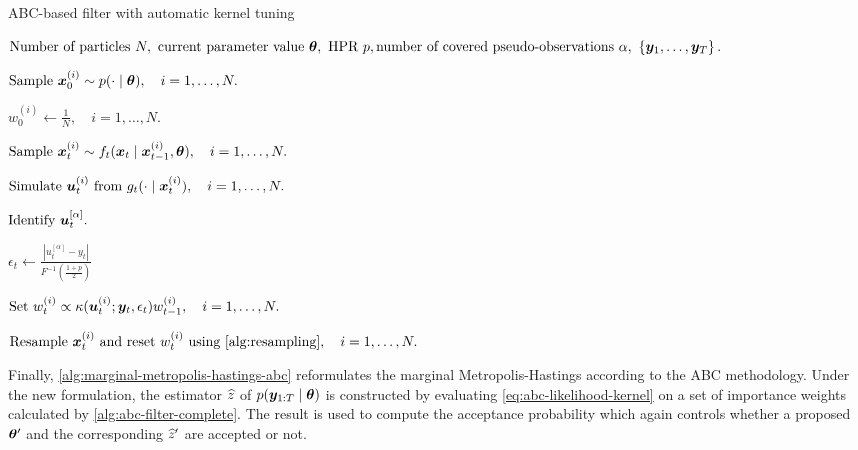 \begin{algorithm}[ht]
    \caption{ABC-based filter with automatic kernel tuning}
    \label{alg:abc-filter-complete}
    \begin{algorithmic}[1]
        \Input $\text{Number of particles } N,\ \text{current parameter value } \btheta, \text{ HPR } p, \newline \text{number of covered pseudo-observations } \alpha,\ \left\{\by_1, \ldots, \by_T\right\}.$
        
        \State $\text{Sample } \bm{x}_0^{(i)} \sim p(\cdot \mid \bm{\theta}), \quad i = 1, \ldots, N.$ 
        
        \State $w_0^{(i)} \gets \frac{1}{N}, \quad i = 1, \ldots, N.$ 
        
        \State $\text{Sample } \bm{x}_t^{(i)} \sim f_t(\bm{x}_t \mid \bm{x}_{t-1}^{(i)}, \bm{\theta}), \quad i = 1, \ldots, N.$ 
        
        \State $\text{Simulate } \bm{u}_t^{(i)} \text{ from } g_t(\cdot \mid \bm{x}_t^{(i)}), \quad i = 1, \ldots, N.$ 
        
        \State $\text{Identify } \bm{u}_t^{[\alpha]}.$ 
        
        \State $\epsilon_t \gets \frac{\left| u_t^{[\alpha]} - y_t \right|}{F^{-1}(\frac{1+p}{2})}$ 
        
        \State $\text{Set } w_t^{(i)} \propto \kappa(\bm{u}_t^{(i)}; \bm{y}_t, \epsilon_t) w_{t-1}^{(i)}, \quad i = 1, \ldots, N.$
        
        \State $\text{Resample } \bx_t^{(i)} \text{ and reset } w_t^{(i)} \text{ using \autoref{alg:resampling}}, \quad i = 1, \ldots, N.$
        \EndFor
    \end{algorithmic}
\end{algorithm}

Finally, \autoref{alg:marginal-metropolis-hastings-abc} reformulates the marginal Metropolis-Hastings according to the ABC methodology. Under the new formulation, the estimator $\widehat{z}$ of $p(\bm{y}_{1:T} \mid \bm{\theta})$ is constructed by evaluating \eqref{eq:abc-likelihood-kernel} on a set of importance weights calculated by \autoref{alg:abc-filter-complete}. The result is used to compute the acceptance probability which again controls whether a proposed $\bm{\theta}^\prime$ and the corresponding $\widehat{z}^\prime$ are accepted or not.


